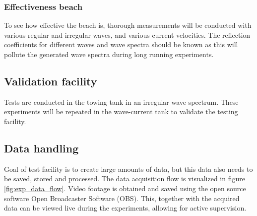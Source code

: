 \subsubsection{Effectiveness beach}
\label{sec:results_beach}
To see how effective the beach is, thorough measurements will be conducted with various regular and irregular waves, and various current velocities. The reflection coefficients for different waves and wave spectra should be known as this will pollute the generated wave spectra during long running experiments.

\subsection{Validation facility}
\label{sec:validation_facility}
Tests are conducted in the towing tank in an irregular wave spectrum. These experiments will be repeated in the wave-current tank to validate the testing facility.

\subsection{Data handling}
\label{sec:data_handeling}
Goal of test facility is to create large amounts of data, but this data also needs to be saved, stored and processed. The data acquisition flow is visualized in figure \ref{fig:exp_data_flow}. 
Video footage is obtained and saved using the open source software Open Broadcaster Software (OBS). This, together with the acquired data can be viewed live during the experiments, allowing for active supervision.



